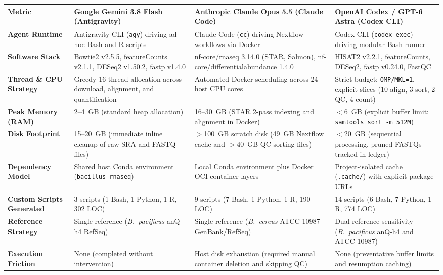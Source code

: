 \documentclass[11pt,letterpaper]{article}
\begin{document}
\begin{table}[!htbp]
\centering
\footnotesize
\begin{tabularx}{\textwidth}{p{2.8cm}XXX}
\toprule
\textbf{Metric} & \textbf{Google Gemini 3.8 Flash (Antigravity)} & \textbf{Anthropic Claude Opus 5.5 (Claude Code)} & \textbf{OpenAI Codex / GPT-6 Astra (Codex CLI)} \\
\midrule
\textbf{Agent Runtime} & Antigravity CLI (\texttt{agy}) driving ad-hoc Bash and R scripts & Claude Code (\texttt{cc}) driving Nextflow workflows via Docker & Codex CLI (\texttt{codex exec}) driving modular Bash runner \\
\addlinespace
\textbf{Software Stack} & Bowtie2 v2.5.5, featureCounts v2.1.1, DESeq2 v1.50.2, fastp v1.4.0 & nf-core/rnaseq 3.14.0 (STAR, Salmon), nf-core/differentialabundance 1.4.0 & HISAT2 v2.2.1, featureCounts, DESeq2, fastp v0.24.0, FastQC \\
\addlinespace
\textbf{Thread \& CPU Strategy} & Greedy 16-thread allocation across download, alignment, and quantification & Automated Docker scheduling across 24 host CPU cores & Strict budget: \texttt{OMP/MKL=1}, explicit slices (10 align, 3 sort, 2 QC, 4 count) \\
\addlinespace
\textbf{Peak Memory (RAM)} & 2--4~GB (standard heap allocation) & 16--30~GB (STAR 2-pass indexing and alignment in Docker) & $<$6~GB (explicit buffer limit: \texttt{samtools sort -m 512M}) \\
\addlinespace
\textbf{Disk Footprint} & 15--20~GB (immediate inline cleanup of raw SRA and FASTQ files) & $>$100~GB scratch disk (49~GB Nextflow cache and $>$40~GB QC sorting files) & $<$20~GB (sequential processing, pruned FASTQs tracked in ledger) \\
\addlinespace
\textbf{Dependency Model} & Shared host Conda environment (\texttt{bacillus\_rnaseq}) & Local Conda environment plus Docker OCI container layers & Project-isolated cache (\texttt{.cache/}) with explicit package URLs \\
\addlinespace
\textbf{Custom Scripts Generated} & 3 scripts (1 Bash, 1 Python, 1 R, 302 LOC) & 9 scripts (7 Bash, 1 Python, 1 R, 190 LOC) & 14 scripts (6 Bash, 7 Python, 1 R, 774 LOC) \\
\addlinespace
\textbf{Reference Strategy} & Single reference (\textit{B.~pacificus} anQ-h4 RefSeq) & Single reference (\textit{B.~cereus} ATCC 10987 GenBank/RefSeq) & Dual-reference sensitivity (\textit{B.~pacificus} anQ-h4 and ATCC 10987) \\
\addlinespace
\textbf{Execution Friction} & None (completed without intervention) & Host disk exhaustion (required manual container deletion and skipping QC) & None (preventative buffer limits and resumption caching) \\

\end{tabularx}
\end{table}
\end{document}
